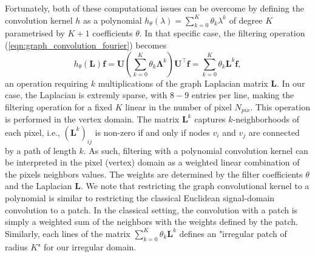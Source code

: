 \documentclass[final,twocolumn,3p,times,authoryear]{elsarticle}
\newcommand{\nati}[1]{{\color[rgb]{.1,.6,.1}{#1}}}
\newcommand{\TK}[1]{{\color{red}{TK:#1}}}
\newcommand{\todo}[1]{{\color[rgb]{.6,.1,.6}{#1}}}
\newcommand{\eqnref}[1]{(\ref{eqn:#1})}
\renewcommand{\b}[1]{{\bm{#1}}}   %
\newcommand{\1}{\b{1}}              %
\newcommand{\0}{\b{0}}              %
\renewcommand{\L}{\b{L}}
\newcommand{\U}{\b{U}}
\newcommand{\f}{\b{f}}
\newcommand{\trans}{^\intercal}
\newcommand{\bLambda}{\b{\Lambda}}
\begin{document}
Fortunately, both of these computational issues can be overcome by defining the convolution kernel $h$ as a polynomial $h_\theta(\lambda) = \sum_{k=0}^K \theta_k \lambda^k$ of degree $K$ parametrised by $K+1$ coefficients $\theta$.
In that specific case, the filtering operation \eqnref{graph_convolution_fourier} becomes
\begin{equation} \label{eqn:graph_convolution_monomial}
	h_\theta(\L) \f =  \U \left(\sum_{k=0}^K \theta_k \bLambda^k \right) \U\trans \f = \sum_{k=0}^K \theta_k \L^k \f,
\end{equation}
an operation requiring $k$ multiplications of the graph Laplacian matrix $\L$.
In our case, the Laplacian is extremly sparse, with $8-9$ entries per line, making the filtering operation for a fixed $K$ linear in the number of pixel $N_{pix}$.
This operation is performed in the vertex domain.
The matrix $\L^k$ captures $k$-neighborhoods of each pixel, i.e., $(\L^k)_{ij}$ is non-zero if and only if nodes $v_i$ and $v_j$ are connected by a path of length $k$.
As such, filtering with a polynomial convolution kernel can be interpreted in the pixel (vertex) domain as a weighted linear combination of the pixels neighbors values. The weights are determined by the filter coefficients $\theta$ and the Laplacian $\L$.
We note that restricting the graph convolutional kernel to a polynomial is similar to restricting the classical Euclidean signal-domain convolution to a patch. In the classical setting, the convolution with a patch is simply a weighted sum of the neighbors with the weights defined by the patch. Similarly, each lines of the matrix $\sum_{k=0}^K \theta_k \L^k$ defines an "irregular patch of radius $K$" for our irregular domain.

\end{document}
